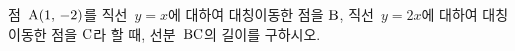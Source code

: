 점~$\mathrm{A}(1,\,-2)$를 직선~$y=x$에 대하여 대칭이동한 점을 $\mathrm{B}$, 직선~$y=2x$에 대하여 대칭이동한 점을 $\mathrm{C}$라 할 때, 선분~$\mathrm{BC}$의 길이를 구하시오.
